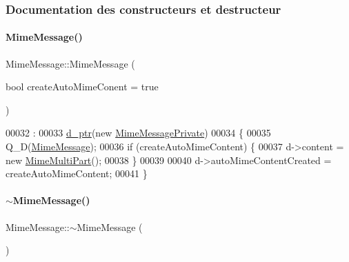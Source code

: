 \subsubsection{Documentation des constructeurs et destructeur}
\mbox{\label{class_simple_mail_1_1_mime_message_a3ab61502fa784f8aebdacbec4a86ce49}} 
\paragraph{\texorpdfstring{Mime\+Message()}{MimeMessage()}}
{\footnotesize\ttfamily Mime\+Message\+::\+Mime\+Message (\begin{DoxyParamCaption}\item[{bool}]{create\+Auto\+Mime\+Conent = {\ttfamily true} }\end{DoxyParamCaption})}


\begin{DoxyCode}
00032                                                    :
00033     \hyperlink{class_simple_mail_1_1_mime_message_abb70ca7430a820f75203dd6bd66cc47f}{d\_ptr}(\textcolor{keyword}{new} \hyperlink{class_simple_mail_1_1_mime_message_private}{MimeMessagePrivate})
00034 \{
00035     Q\_D(\hyperlink{class_simple_mail_1_1_mime_message}{MimeMessage});
00036     \textcolor{keywordflow}{if} (createAutoMimeContent) \{
00037         d->content = \textcolor{keyword}{new} \hyperlink{class_simple_mail_1_1_mime_multi_part}{MimeMultiPart}();
00038     \}
00039 
00040     d->autoMimeContentCreated = createAutoMimeContent;
00041 \}
\end{DoxyCode}
\mbox{\label{class_simple_mail_1_1_mime_message_ae5005458f2bf64ad5255b8d12e0a324c}} 
\paragraph{\texorpdfstring{$\sim$\+Mime\+Message()}{~MimeMessage()}}
{\footnotesize\ttfamily Mime\+Message\+::$\sim$\+Mime\+Message (\begin{DoxyParamCaption}{ }\end{DoxyParamCaption})\hspace{0.3cm}{\ttfamily [virtual]}}



